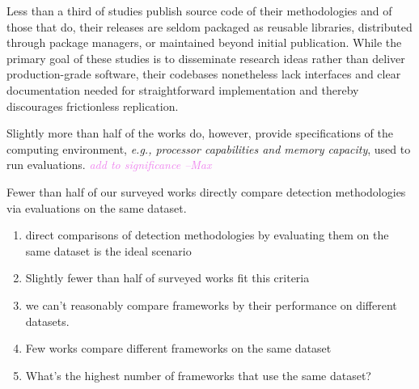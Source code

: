 \documentclass[manuscript,nonacm]{acmart}
\newcommand{\maxnote}[1]{\textit{\textcolor{violet}{#1 --Max}}}
\begin{document}
Less than a third of studies publish source code of their methodologies and of those that do, their releases are seldom packaged as reusable libraries, distributed through package managers, or maintained beyond initial publication. 
While the primary goal of these studies is to disseminate research ideas rather than deliver production-grade software, their codebases nonetheless lack interfaces and clear documentation needed for straightforward implementation and thereby discourages frictionless replication.

Slightly more than half of the works do, however, provide specifications of the computing environment, \textit{e.g., processor capabilities and memory capacity}, used to run evaluations.
\maxnote{add to significance}

Fewer than half of our surveyed works directly compare detection methodologies via evaluations on the same dataset.


\begin{enumerate}
    \item direct comparisons of detection methodologies by evaluating them on the same dataset is the ideal scenario
    \item Slightly fewer than half of surveyed works fit this criteria
	\item we can't reasonably compare frameworks by their performance on different datasets.
	\item Few works compare different frameworks on the same dataset
	\item What's the highest number of frameworks that use the same dataset?
\end{enumerate}
\end{document}
